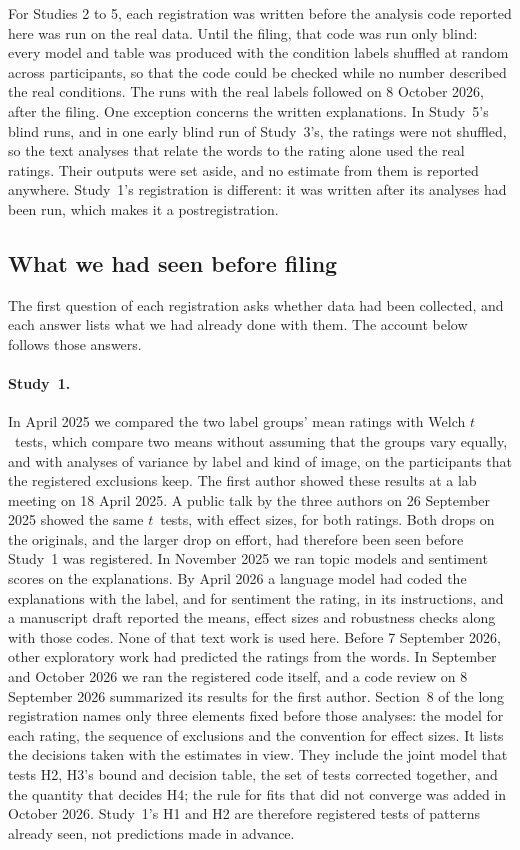 For Studies 2 to 5, each registration was written before the analysis code reported here was run on the real data. Until the filing, that code was run only blind: every model and table was produced with the condition labels shuffled at random across participants, so that the code could be checked while no number described the real conditions. The runs with the real labels followed on 8 October 2026, after the filing. One exception concerns the written explanations. In Study~5's blind runs, and in one early blind run of Study~3's, the ratings were not shuffled, so the text analyses that relate the words to the rating alone used the real ratings. Their outputs were set aside, and no estimate from them is reported anywhere. Study~1's registration is different: it was written after its analyses had been run, which makes it a postregistration.

\subsection*{What we had seen before filing}

The first question of each registration asks whether data had been collected, and each answer lists what we had already done with them. The account below follows those answers.

\paragraph*{Study~1.}
In April 2025 we compared the two label groups' mean ratings with Welch $t$~tests, which compare two means without assuming that the groups vary equally, and with analyses of variance by label and kind of image, on the \SOneN{} participants that the registered exclusions keep. The first author showed these results at a lab meeting on 18 April 2025. A public talk by the three authors on 26 September 2025 showed the same $t$~tests, with effect sizes, for both ratings. Both drops on the originals, and the larger drop on effort, had therefore been seen before Study~1 was registered. In November 2025 we ran topic models and sentiment scores on the explanations. By April 2026 a language model had coded the explanations with the label, and for sentiment the rating, in its instructions, and a manuscript draft reported the means, effect sizes and robustness checks along with those codes. None of that text work is used here. Before 7 September 2026, other exploratory work had predicted the ratings from the words. In September and October 2026 we ran the registered code itself, and a code review on 8 September 2026 summarized its results for the first author. Section~8 of the long registration names only three elements fixed before those analyses: the model for each rating, the sequence of exclusions and the convention for effect sizes. It lists the decisions taken with the estimates in view. They include the joint model that tests H2, H3's bound and decision table, the set of tests corrected together, and the quantity that decides H4; the rule for fits that did not converge was added in October 2026. Study~1's H1 and H2 are therefore registered tests of patterns already seen, not predictions made in advance.

